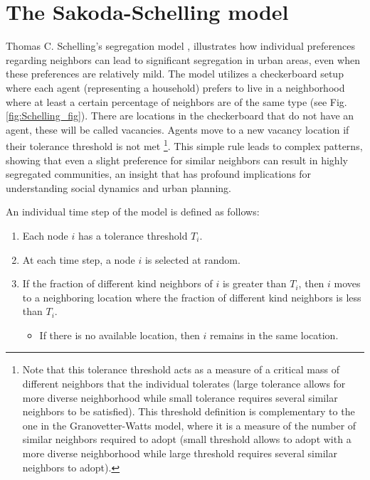 \section{\label{sec:The Sakoda-Schelling model} The Sakoda-Schelling model}

Thomas C. Schelling's segregation model \cite{schelling-1969}, illustrates how individual preferences regarding neighbors can lead to significant segregation in urban areas, even when these preferences are relatively mild. The model utilizes a checkerboard setup where each agent (representing a household) prefers to live in a neighborhood where at least a certain percentage of neighbors are of the same type (see Fig. \ref{fig:Schelling_fig}). There are locations in the checkerboard that do not have an agent, these will be called vacancies. Agents move to a new vacancy location if their tolerance threshold is not met \footnote{\sffamily\small Note that this  tolerance threshold acts as a measure of a critical mass of different neighbors that the individual tolerates (large tolerance allows for more diverse neighborhood while small tolerance requires several similar neighbors to be satisfied). This threshold definition is complementary to the one in the Granovetter-Watts model, where it is a measure of the number of similar neighbors required to adopt (small threshold allows to adopt with a more diverse neighborhood while large threshold requires several similar neighbors to adopt).}. This simple rule leads to complex patterns, showing that even a slight preference for similar neighbors can result in highly segregated communities, an insight that has profound implications for understanding social dynamics and urban planning. 
\pagebreak

\begin{theorem}
    \sffamily\small
    An individual time step of the model is defined as follows:
    \begin{enumerate}
        \item Each node $i$ has a tolerance threshold $T_i$.
        \item At each time step, a node $i$ is selected at random.
        \item If the fraction of different kind neighbors of $i$ is greater than $T_i$, then $i$ moves to a neighboring location where the fraction of different kind neighbors is less than $T_i$.
            \begin{itemize}
                \item If there is no available location, then $i$ remains in the same location.
            \end{itemize}
    \end{enumerate}
\end{theorem}

